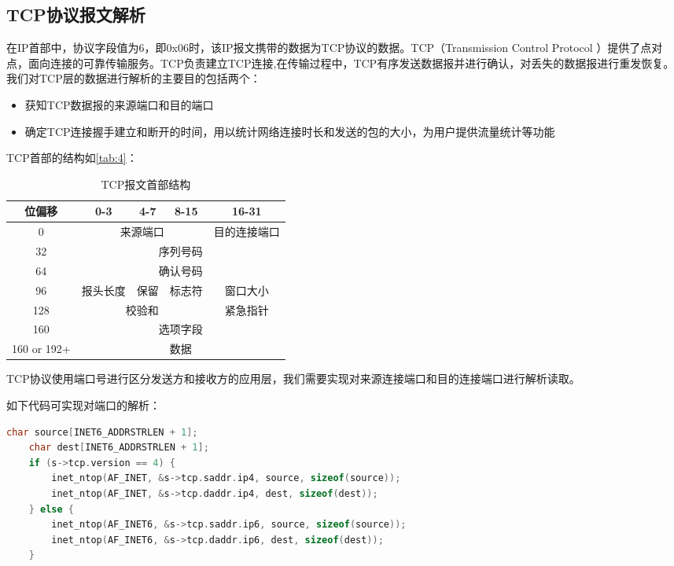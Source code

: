 \documentclass[format=final, language=chinese, degree=fyp]{hustthesis}
\begin{document}
\subsection{TCP协议报文解析}

在IP首部中，协议字段值为6，即0x06时，该IP报文携带的数据为TCP协议的数据。TCP（Transmission Control Protocol ）提供了点对点，面向连接的可靠传输服务。TCP负责建立TCP连接,在传输过程中，TCP有序发送数据报并进行确认，对丢失的数据报进行重发恢复。我们对TCP层的数据进行解析的主要目的包括两个：
    
    \begin{itemize}
       	\item 获知TCP数据报的来源端口和目的端口
       	\item 确定TCP连接握手建立和断开的时间，用以统计网络连接时长和发送的包的大小，为用户提供流量统计等功能
    \end{itemize}
    
TCP首部的结构如\autoref{tab:4}：

\begin{table}[h!]
\centering
\caption{TCP报文首部结构}\label{tab:4}
\begin{tabular}{|c|c|c|c|c|}
	\hline
	位偏移 & 0-3 & 4-7 & 8-15 & 16-31\\\hline
	0 & \multicolumn{3}{c|}{来源端口} & 目的连接端口 \\\hline
	32 & \multicolumn{4}{c|}{序列号码}  \\\hline
	64 & \multicolumn{4}{c|}{确认号码}  \\\hline
	96 & 报头长度 & 保留 & 标志符 & 窗口大小 \\	\hline
	128 & \multicolumn{3}{c|}{校验和} & 紧急指针 \\\hline
	160 & \multicolumn{4}{c|}{选项字段} \\\hline
	160 or 192+ & \multicolumn{4}{c|}{数据}\\\hline
\end{tabular}
\end{table}

TCP协议使用端口号进行区分发送方和接收方的应用层，我们需要实现对来源连接端口和目的连接端口进行解析读取。

如下代码可实现对端口的解析：

\begin{lstlisting}[language=c]
    char source[INET6_ADDRSTRLEN + 1];
    char dest[INET6_ADDRSTRLEN + 1];
    if (s->tcp.version == 4) {
        inet_ntop(AF_INET, &s->tcp.saddr.ip4, source, sizeof(source));
        inet_ntop(AF_INET, &s->tcp.daddr.ip4, dest, sizeof(dest));
    } else {
        inet_ntop(AF_INET6, &s->tcp.saddr.ip6, source, sizeof(source));
        inet_ntop(AF_INET6, &s->tcp.daddr.ip6, dest, sizeof(dest));
    }
\end{lstlisting}
\end{document}
